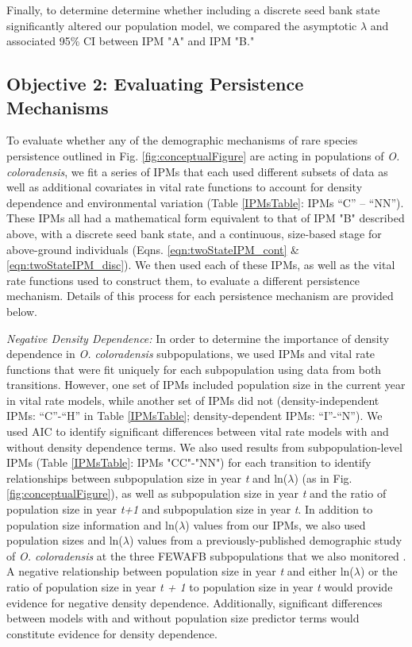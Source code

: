 \documentclass[12pt, letterpaper]{article}
\begin{document}
Finally, to determine determine whether including a discrete seed bank state significantly altered our population model, we compared the asymptotic $\lambda$ and associated 95\% CI between IPM "A" and IPM "B." 

\subsection{Objective 2: Evaluating Persistence Mechanisms}
To evaluate whether any of the demographic mechanisms of rare species persistence outlined in Fig. \ref{fig:conceptualFigure} are acting in populations of \textit{O. coloradensis}, we fit a series of IPMs that each used different subsets of data as well as additional covariates in vital rate functions to account for density dependence and environmental variation (Table \ref{IPMsTable}: IPMs “C” – “NN”). These IPMs all had a mathematical form equivalent to that of IPM "B" described above, with a discrete seed bank state, and a continuous, size-based stage for above-ground individuals (Eqns. \ref{eqn:twoStateIPM_cont} \& \ref{eqn:twoStateIPM_disc}). We then used each of these IPMs, as well as the vital rate functions used to construct them, to evaluate a different persistence mechanism. Details of this process for each persistence mechanism are provided below. 

\textit{Negative Density Dependence:} In order to determine the importance of density dependence in \textit{O. coloradensis} subpopulations, we used IPMs and vital rate functions that were fit uniquely for each subpopulation using data from both transitions. However, one set of IPMs included population size in the current year in vital rate models, while another set of IPMs did not (density-independent IPMs: “C”-“H” in Table \ref{IPMsTable}; density-dependent IPMs: “I”-“N”). We used AIC to identify significant differences between vital rate models with and without density dependence terms. We also used results from subpopulation-level IPMs (Table \ref{IPMsTable}: IPMs "CC"-"NN") for each transition to identify relationships between subpopulation size in year \textit{t}  and ln($\lambda$) (as in Fig. \ref{fig:conceptualFigure}), as well as subpopulation size in year \textit{t} and the ratio of population size in year \textit{t+1 }and subpopulation size in year \textit{t}. In addition to population size information and ln($\lambda$) values from our IPMs, we also used population sizes and ln($\lambda$) values from a previously-published demographic study of \textit{O. coloradensis} at the three FEWAFB subpopulations that we also monitored \cite{Floyd1998}.  A negative relationship between population size in year \textit{t} and either ln($\lambda$) or the ratio of population size in year \textit{t + 1} to population size in year \textit{t} would provide evidence for negative density dependence. Additionally, significant differences between models with and without population size predictor terms would constitute evidence for density dependence.  
\end{document}
